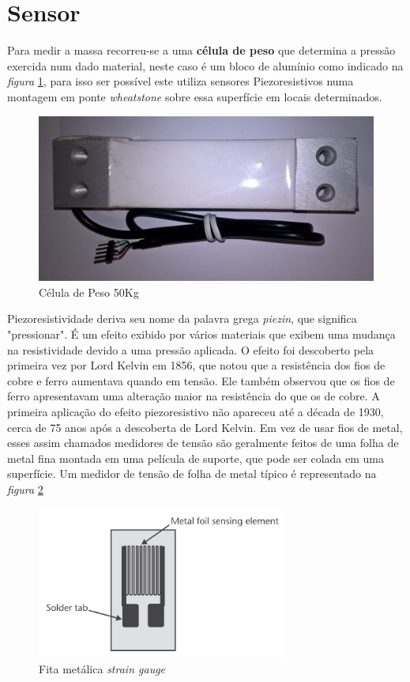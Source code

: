 \section{Sensor}
Para medir a massa recorreu-se a uma \textbf{célula de peso} que determina a pressão exercida num dado material, neste caso é um bloco de alumínio como indicado na \textit{figura} \ref{Load_Cell_1}, para isso ser possível este utiliza sensores Piezoresistivos numa montagem em ponte \textit{wheatstone} sobre essa superfície em locais determinados.
\begin{figure}[H]
	\captionsetup{justification=raggedright,singlelinecheck=false}
	\flushleft
	\includegraphics[scale=0.15]{./image/PESTA/material/Load_Cell_1.jpg}
	\caption{Célula de Peso 50Kg}
	\label{Load_Cell_1}
\end{figure}
Piezoresistividade deriva seu nome da palavra grega \textit{piezin}, que significa "pressionar". É um efeito exibido por vários materiais que exibem uma mudança na resistividade devido a uma pressão aplicada. O efeito foi descoberto pela primeira vez por Lord Kelvin em 1856, que notou que a resistência dos fios de cobre e ferro aumentava quando em tensão. Ele também observou que os fios de ferro apresentavam uma alteração maior na resistência do que os de cobre. A primeira aplicação do efeito piezoresistivo não apareceu até a década de 1930, cerca de 75 anos após a descoberta de Lord Kelvin. Em vez de usar fios de metal, esses assim chamados medidores de tensão são geralmente feitos de uma folha de metal fina montada em uma película de suporte, que pode ser colada em uma superfície. Um medidor de tensão de folha de metal típico é representado na \textit{figura} \ref{strain_gauge_1} \cite{book-9}
\begin{figure}[H]
	\centering
	\includegraphics[height=5cm]{./image/PESTA/general/strain_gauge_1.jpg}
	\caption{Fita metálica \textit{strain gauge} \cite{book-9}}
	\label{strain_gauge_1}
\end{figure}
